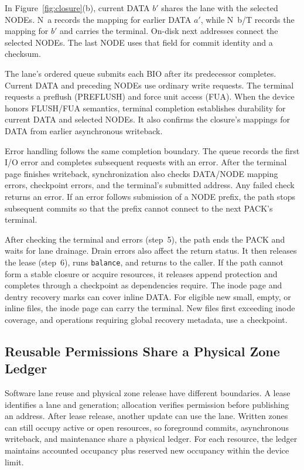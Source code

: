 In Figure~\ref{fig:closure}(b), current DATA $b'$ shares the lane with the selected NODEs.
N~a records the mapping for earlier DATA $a'$, while N~b/T records the mapping for $b'$ and carries the terminal.
On-disk next addresses connect the selected NODEs.
The last NODE uses that field for commit identity and a checksum.

The lane's ordered queue submits each BIO after its predecessor completes.
Current DATA and preceding NODEs use ordinary write requests.
The terminal requests a preflush (PREFLUSH) and force unit access (FUA).
When the device honors FLUSH/FUA semantics, terminal completion establishes durability for current DATA and selected NODEs.
It also confirms the closure's mappings for DATA from earlier asynchronous writeback.

Error handling follows the same completion boundary.
The queue records the first I/O error and completes subsequent requests with an error.
After the terminal page finishes writeback, synchronization also checks DATA/NODE mapping errors, checkpoint errors, and the terminal's submitted address.
Any failed check returns an error.
If an error follows submission of a NODE prefix, the path stops subsequent commits so that the prefix cannot connect to the next PACK's terminal.

After checking the terminal and errors (step~5), the path ends the PACK and waits for lane drainage.
Drain errors also affect the return status.
It then releases the lease (step~6), runs \texttt{balance}, and returns to the caller.
If the path cannot form a stable closure or acquire resources, it releases append protection and completes through a checkpoint as dependencies require.
The inode page and dentry recovery marks can cover inline DATA.
For eligible new small, empty, or inline files, the inode page can carry the terminal.
New files first exceeding inode coverage, and operations requiring global recovery metadata, use a checkpoint.



\subsection{Reusable Permissions Share a Physical Zone Ledger}\label{sec:lease}
Software lane reuse and physical zone release have different boundaries.
A lease identifies a lane and generation; allocation verifies permission before publishing an address.
After lease release, another update can use the lane.
Written zones can still occupy active or open resources, so foreground commits, asynchronous writeback, and maintenance share a physical ledger.
For each resource, the ledger maintains accounted occupancy plus reserved new occupancy within the device limit.

